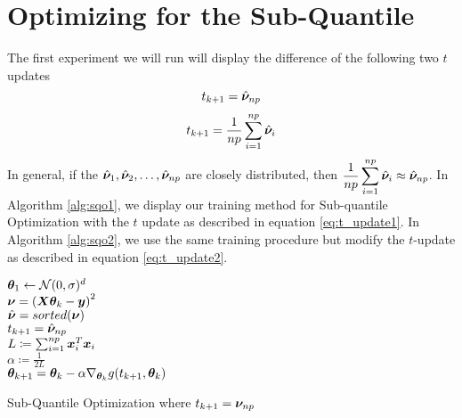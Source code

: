 \documentclass{article} %
\begin{document}
	
	\section{Optimizing for the Sub-Quantile}

	The first experiment we will run will display the difference of the following two $t$ updates \begin{equation} \label{eq:t_update1} t_{k+1} = \hat{{\bm{\nu}}}_{np}\end{equation}  \begin{equation} \label{eq:t_update2} t_{k+1} = \frac{1}{np}\sum_{i=1}^{np}\hat{{\bm{\nu}}}_i \end{equation}In general, if the $\hat{{\bm{\nu}}}_1, \hat{{\bm{\nu}}}_2, \dots, \hat{{\bm{\nu}}}_{np}$ are closely distributed, then $\displaystyle \frac{1}{np}\sum_{i=1}^{np}\hat{{\bm{\nu}}}_{i} \approx \hat{{\bm{\nu}}}_{np}$. In Algorithm \ref{alg:sqo1}, we display our training method for Sub-quantile Optimization with the $t$ update as described in equation \ref{eq:t_update1}. In Algorithm \ref{alg:sqo2}, we use the same training procedure but modify the $t$-update as described in equation \ref{eq:t_update2}. 
	
	\begin{algorithm}[H]
		\DontPrintSemicolon
		
		${\bm{\theta}}_1 \gets \mathcal{N}(0,\sigma)^d$\\
		{
			$\displaystyle {\bm{\nu}} = \left({\bm{X}}{\bm{\theta}}_k - {\bm{y}}\right)^2$\\
			$\hat{{\bm{\nu}}} = sorted({\bm{\nu}})$\\
			$\displaystyle t_{k+1} = \hat{{\bm{\nu}}}_{np}$\\
			$L \coloneqq \sum_{i=1}^{np} {\bm{x}}_i^T{\bm{x}}_i$\\
			$\alpha \coloneqq \frac{1}{2L}$\\
			$\displaystyle {\bm{\theta}}_{k+1} = {\bm{\theta}}_k - \alpha \nabla_{{\bm{\theta}}_k}g(t_{k+1},{\bm{\theta}}_k)$
		}
		\caption{Sub-Quantile Optimization where $t_{k+1} = {\bm{\nu}}_{np}$}
		\label{alg:sqo1}
	\end{algorithm}
\end{document}
